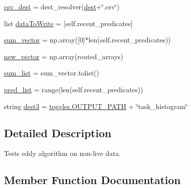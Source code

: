 \begin{DoxyCompactItemize}
\item 
\mbox{\hyperlink{classdynamicfilterapp_1_1test__simulations_1_1_simulation_test_a6eed7f11544aaf90c0880db171d103a6}{csv\+\_\+dest}} = dest\+\_\+resolver(\mbox{\hyperlink{classdynamicfilterapp_1_1test__simulations_1_1_simulation_test_a66d4da94e0e4f717ff3e7f23c53f7c2d}{dest}}+\char`\"{}.csv\char`\"{})
\item 
list \mbox{\hyperlink{classdynamicfilterapp_1_1test__simulations_1_1_simulation_test_a213f043d9f337910e40da2aac8b37a87}{data\+To\+Write}} = \mbox{[}self.\+recent\+\_\+predicates\mbox{]}
\item 
\mbox{\hyperlink{classdynamicfilterapp_1_1test__simulations_1_1_simulation_test_a418948863130332c47bda07a24a9866f}{sum\+\_\+vector}} = np.\+array(\mbox{[}0\mbox{]}$\ast$len(self.\+recent\+\_\+predicates))
\item 
\mbox{\hyperlink{classdynamicfilterapp_1_1test__simulations_1_1_simulation_test_afadfad23c54c2616cbe6bff430f72e5b}{new\+\_\+vector}} = np.\+array(routed\+\_\+arrays)
\item 
\mbox{\hyperlink{classdynamicfilterapp_1_1test__simulations_1_1_simulation_test_af26c236cdeca420e57950e94386ca3c3}{sum\+\_\+list}} = sum\+\_\+vector.\+tolist()
\item 
\mbox{\hyperlink{classdynamicfilterapp_1_1test__simulations_1_1_simulation_test_a9ecbfebeaf51a31cbe46c8ce7814e330}{pred\+\_\+list}} = range(len(self.\+recent\+\_\+predicates))
\item 
string \mbox{\hyperlink{classdynamicfilterapp_1_1test__simulations_1_1_simulation_test_a8e2377aa159f703f8480b3cdce41e396}{dest3}} = \mbox{\hyperlink{namespacedynamicfilterapp_1_1toggles_a04644ded1d5e3fc8bd58a411209b7886}{toggles.\+O\+U\+T\+P\+U\+T\+\_\+\+P\+A\+TH}} + \char`\"{}task\+\_\+histogram\char`\"{}
\end{DoxyCompactItemize}


\subsection{Detailed Description}
\begin{DoxyVerb}Tests eddy algorithm on non-live data.
\end{DoxyVerb}
 

\subsection{Member Function Documentation}
\mbox{\label{classdynamicfilterapp_1_1test__simulations_1_1_simulation_test_a1e7e4ad765387840293e282eaf2b20bf}} 
